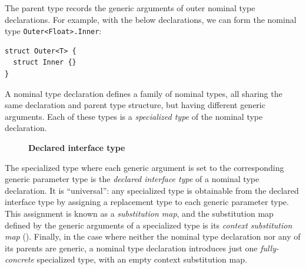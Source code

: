 \documentclass[../generics]{subfiles}
\begin{document}
The parent type records the generic arguments of outer nominal type declarations. For example, with the below declarations, we can form the nominal type \texttt{Outer<Float>.Inner}:

\medskip

\noindent
\begin{minipage}{24em}
\begin{Verbatim}
struct Outer<T> {
  struct Inner {}
}
\end{Verbatim}
\end{minipage}

\medskip

A nominal type declaration defines a family of nominal types, all sharing the same declaration and parent type structure, but having different generic arguments. Each of these types is a \emph{specialized type} of the nominal type declaration.

\begin{figure}
\begin{center}\textbf{Declared interface type}\end{center}
\end{figure}

\smallskip

The specialized type where each generic argument is set to the corresponding generic parameter type is the \emph{declared interface type} of a nominal type declaration. It is ``universal'': any specialized type is obtainable from the declared interface type by assigning a replacement type to each generic parameter type. This assignment is known as a \emph{substitution map}, and the substitution map defined by the generic arguments of a specialized type is its \emph{context substitution map} (). Finally, in the case where neither the nominal type declaration nor any of its parents are generic, a nominal type declaration introduces just one \emph{fully-concrete} specialized type, with an empty context substitution map.
\end{document}
